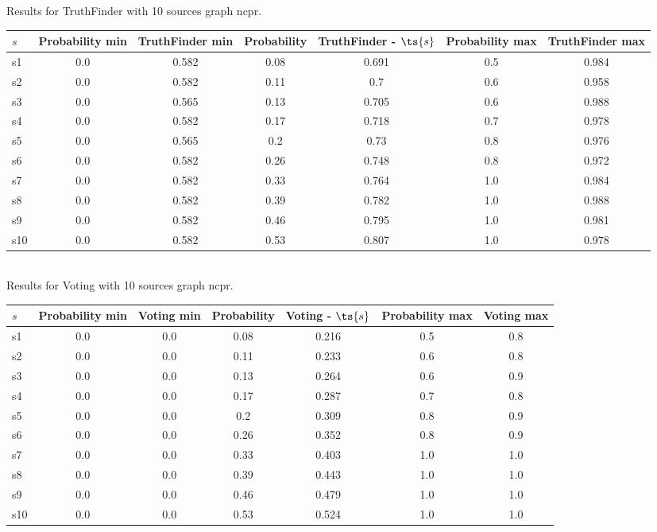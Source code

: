 \documentclass{article}
\begin{document}
\noindent Results for TruthFinder with 10 sources graph ncpr.

\noindent\begin{tabular}{|l|c|c|c|c|c|c|}
\hline
$s$& Probability min & TruthFinder min & Probability & TruthFinder - $\ts{s}$ & Probability max & TruthFinder max\\
\hline
s1 &0.0 & 0.582 & 0.08 & 0.691 & 0.5 & 0.984\\
\hline
s2 &0.0 & 0.582 & 0.11 & 0.7 & 0.6 & 0.958\\
\hline
s3 &0.0 & 0.565 & 0.13 & 0.705 & 0.6 & 0.988\\
\hline
s4 &0.0 & 0.582 & 0.17 & 0.718 & 0.7 & 0.978\\
\hline
s5 &0.0 & 0.565 & 0.2 & 0.73 & 0.8 & 0.976\\
\hline
s6 &0.0 & 0.582 & 0.26 & 0.748 & 0.8 & 0.972\\
\hline
s7 &0.0 & 0.582 & 0.33 & 0.764 & 1.0 & 0.984\\
\hline
s8 &0.0 & 0.582 & 0.39 & 0.782 & 1.0 & 0.988\\
\hline
s9 &0.0 & 0.582 & 0.46 & 0.795 & 1.0 & 0.981\\
\hline
s10 &0.0 & 0.582 & 0.53 & 0.807 & 1.0 & 0.978\\
\hline
\end{tabular}\\

\noindent Results for Voting with 10 sources graph ncpr.

\noindent\begin{tabular}{|l|c|c|c|c|c|c|}
\hline
$s$& Probability min & Voting min & Probability & Voting - $\ts{s}$ & Probability max & Voting max\\
\hline
s1 &0.0 & 0.0 & 0.08 & 0.216 & 0.5 & 0.8\\
\hline
s2 &0.0 & 0.0 & 0.11 & 0.233 & 0.6 & 0.8\\
\hline
s3 &0.0 & 0.0 & 0.13 & 0.264 & 0.6 & 0.9\\
\hline
s4 &0.0 & 0.0 & 0.17 & 0.287 & 0.7 & 0.8\\
\hline
s5 &0.0 & 0.0 & 0.2 & 0.309 & 0.8 & 0.9\\
\hline
s6 &0.0 & 0.0 & 0.26 & 0.352 & 0.8 & 0.9\\
\hline
s7 &0.0 & 0.0 & 0.33 & 0.403 & 1.0 & 1.0\\
\hline
s8 &0.0 & 0.0 & 0.39 & 0.443 & 1.0 & 1.0\\
\hline
s9 &0.0 & 0.0 & 0.46 & 0.479 & 1.0 & 1.0\\
\hline
s10 &0.0 & 0.0 & 0.53 & 0.524 & 1.0 & 1.0\\
\hline
\end{tabular}\\
\end{document}
